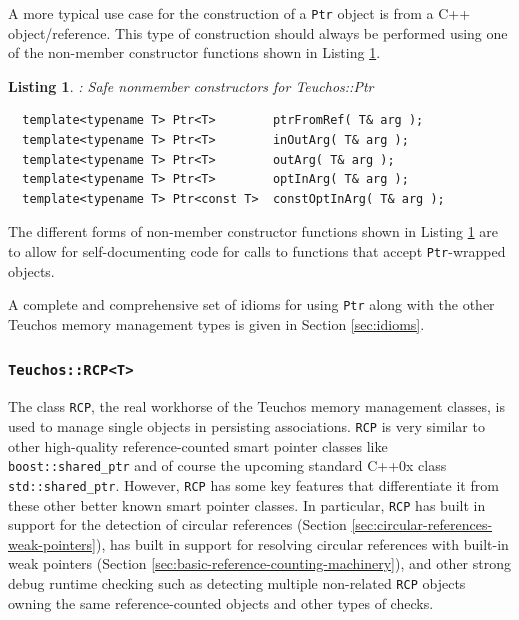 \documentclass[pdf,ps2pdf,11pt]{SANDreport}
\newtheorem{listing}{Listing}
\begin{document}
A more typical use case for the construction of a {}\texttt{Ptr}
object is from a C++ object/reference.  This type of construction
should always be performed using one of the non-member constructor
functions shown in Listing
{}\ref{listing:ptr-from-ref-nonmember-constructors}.

\begin{listing}: Safe nonmember constructors for Teuchos::Ptr\\
\label{listing:ptr-from-ref-nonmember-constructors}
{\small\begin{verbatim}
  template<typename T> Ptr<T>        ptrFromRef( T& arg );
  template<typename T> Ptr<T>        inOutArg( T& arg );
  template<typename T> Ptr<T>        outArg( T& arg );
  template<typename T> Ptr<T>        optInArg( T& arg );
  template<typename T> Ptr<const T>  constOptInArg( T& arg );
\end{verbatim}}
\end{listing}

The different forms of non-member constructor functions shown in
Listing {}\ref{listing:ptr-from-ref-nonmember-constructors} are to
allow for self-documenting code for calls to functions that accept
{}\texttt{Ptr}-wrapped objects.

A complete and comprehensive set of idioms for using {}\texttt{Ptr}
along with the other Teuchos memory management types is given in
Section {}\ref{sec:idioms}.


%
{}\subsubsection{\texttt{Teuchos::RCP<T>}}
%

The class {}\texttt{RCP}, the real workhorse of the Teuchos memory
management classes, is used to manage single objects in persisting
associations.  {}\texttt{RCP} is very similar to other high-quality
reference-counted smart pointer classes like
{}\texttt{boost::shared\_ptr} and of course the upcoming standard
C++0x class {}\texttt{std::shared\_ptr}.  However, {}\texttt{RCP} has
some key features that differentiate it from these other better known
smart pointer classes.  In particular, {}\texttt{RCP} has built in
support for the detection of circular references (Section
{}\ref{sec:circular-references-weak-pointers}), has built in support
for resolving circular references with built-in weak pointers (Section
{}\ref{sec:basic-reference-counting-machinery}), and other strong
debug runtime checking such as detecting multiple non-related
{}\texttt{RCP} objects owning the same reference-counted objects and
other types of checks.
\end{document}
